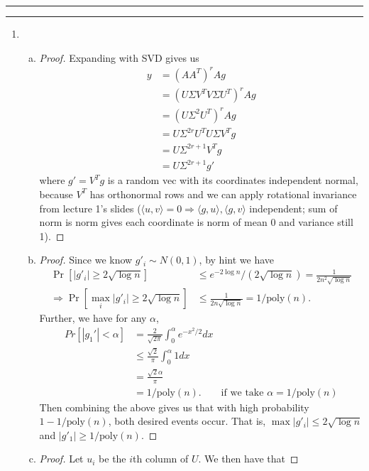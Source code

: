 \documentclass[11pt]{article}
\newcommand{\question}[1] {\vspace{.3in} \hrule\vspace{0.3em}
\noindent{\bf #1} \vspace{0.7em}
\hrule \vspace{.10in}}
\begin{document}
\newpage
\question{Task 2}
\begin{enumerate}[1.]
\item \begin{enumerate}[(a)]
\item \begin{proof}
Expanding with SVD gives us 
\begin{align*}
  y &= (AA^T)^r Ag\\
  &= (U\Sigma V^T V \Sigma U^T)^r Ag\\
  &= (U \Sigma^2 U^T)^r Ag\\
  &= U \Sigma^{2r} U^T U \Sigma V^T g\\
  &= U \Sigma^{2r +1} V^T g\\
  &= U \Sigma^{2r+1} g'
\end{align*}
where $g' = V^T g$ is a random vec with its coordinates independent normal, because $V^T$ has orthonormal rows and we can apply rotational invariance from lecture 1's slides ($\langle u, v \rangle = 0 \Rightarrow \langle g, u\rangle, \langle g, v\rangle$ independent; sum of norm is norm gives each coordinate is norm of mean 0 and variance still 1).
\end{proof}
\item \begin{proof}
Since we know $g'_i \sim N(0, 1)$, by hint we have
\begin{align*}
  \Pr[|g'_i| \ge 2\sqrt{\log n}] &\le e^{-2\log n}/(2\sqrt{\log n}) = \frac{1}{2n^2\sqrt{\log n}}\\
  \Rightarrow \Pr[\max_i |g'_i| \ge 2\sqrt{\log n}] &\le \frac{1}{2n\sqrt{\log n}} = 1/\text{poly}(n).
\end{align*}
Further, we have for any $\alpha$,
\begin{align*}
  Pr[|g_1'| < \alpha] &= \frac{2}{\sqrt{2\pi}} \int_0^\alpha e^{-x^2/2} dx\\
  &\le \frac{\sqrt{2}}{\pi} \int_0^{\alpha} 1 dx\\
  &= \frac{\sqrt{2}\alpha}{\pi}\\
  &= 1/\text{poly}(n). &\text{if we take }\alpha = 1/\text{poly}(n)
\end{align*}
Then combining the above gives us that with high probability $1- 1/\text{poly}(n)$, both desired events occur. That is, $\max |g'_i| \le 2 \sqrt{\log n}$ and $|g'_1| \ge 1/\text{poly}(n)$.
\end{proof}
\item \begin{proof}
Let $u_i$ be the $i$th column of $U$. We then have that 

\end{proof}
\end{enumerate}
\end{enumerate}
\end{document}
